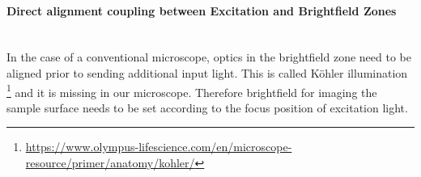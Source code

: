 \paragraph{Direct alignment coupling between Excitation and Brightfield Zones}\mbox{}\\
In the case of a conventional microscope, optics in the brightfield zone need to be aligned
prior to sending additional input light. This is called K\"{o}hler illumination
\footnote{\url{https://www.olympus-lifescience.com/en/microscope-resource/primer/anatomy/kohler/}}
and it is missing in our microscope. Therefore brightfield for imaging the sample surface needs 
to be set according to the focus position of excitation light. 
